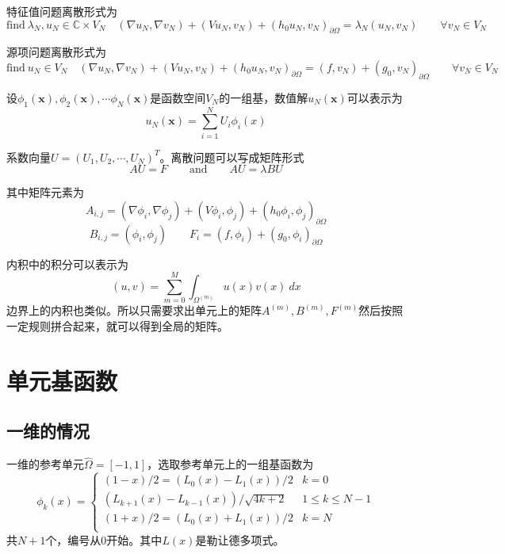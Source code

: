 \documentclass[UTF8,12pt]{article}
\begin{document}
特征值问题离散形式为
\begin{equation}
\text{find} \ \lambda_N, u_N \in \mathbb{C} \times V_N \quad (\nabla u_N, \nabla v_N) + (V u_N, v_N) + (h_0 u_N, v_N)_{\partial\Omega} = \lambda_N (u_N, v_N) \qquad \forall v_N \in V_N
\end{equation}

源项问题离散形式为
\begin{equation}
\text{find} \ u_N \in V_N \quad (\nabla u_N, \nabla v_N) + (V u_N, v_N) + (h_0 u_N, v_N)_{\partial\Omega} = (f, v_N) + (g_0, v_N)_{\partial\Omega} \qquad \forall v_N \in V_N
\end{equation}

设$\phi_1(\mathbf{x}), \phi_2(\mathbf{x}), \cdots \phi_N(\mathbf{x})$是函数空间$V_N$的一组基，数值解$u_N(\mathbf{x})$可以表示为
$$ u_N(\mathbf{x}) = \sum_{i=1}^{N} U_i \phi_{i}(x) $$

系数向量$U = (U_1, U_2, \cdots, U_N)^T$。离散问题可以写成矩阵形式
\begin{equation}
A U = F \qquad \text{and} \qquad A U = \lambda B U
\end{equation}

其中矩阵元素为
$$ A_{i,j} = (\nabla \phi_i, \nabla \phi_j) + (V \phi_i, \phi_j) + (h_0 \phi_i, \phi_j)_{\partial\Omega} $$
$$ B_{i,j} = (\phi_i, \phi_j) \qquad F_i = (f, \phi_i) + (g_0, \phi_i)_{\partial\Omega} $$

内积中的积分可以表示为
$$ (u, v) = \sum_{m=0}^{M} \int_{\Omega^{(m)}} u(x) v(x) \ dx $$
边界上的内积也类似。所以只需要求出单元上的矩阵$A^{(m)},B^{(m)},F^{(m)}$然后按照一定规则拼合起来，就可以得到全局的矩阵。

\section{单元基函数}

\subsection{一维的情况}

一维的参考单元$\hat{\Omega} = [-1,1]$，选取参考单元上的一组基函数为
\begin{equation}
\phi_k(x) = \left\{ \begin{array}{ll}
(1-x)/2 = (L_0(x) - L_1(x))/2 & k = 0 \\
(L_{k+1}(x) - L_{k-1}(x)) / \sqrt{4k+2} & 1 \leq k \leq N-1 \\
(1+x)/2 = (L_0(x) + L_1(x))/2 & k = N \\
\end{array}  \right.
\end{equation}
共$N+1$个，编号从0开始。其中$L(x)$是勒让德多项式。
\end{document}
